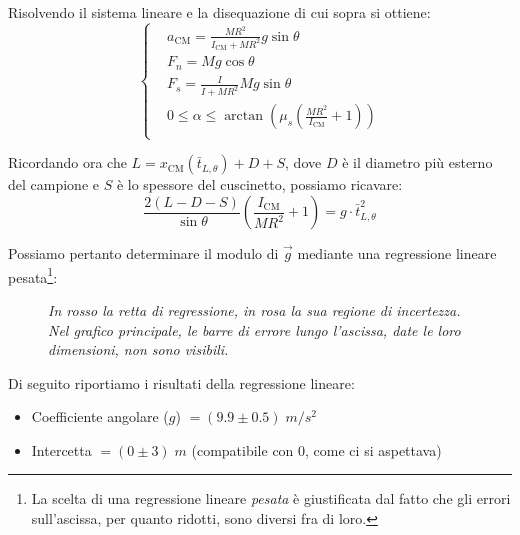 \documentclass{article}
\begin{document}
Risolvendo il sistema lineare e la disequazione di cui sopra si ottiene:
\[\left\{\begin{aligned}
    &a_\text{CM} = \frac{M R^2}{I_\text{CM} + M R^2} g\sin\theta \\
    &F_n = M g \cos\theta \\
    &F_s = \frac{I}{I + M R^2} M g \sin\theta \\
    & 0 \le \alpha \le \arctan\left(\mu_s \left(\frac{MR^2}{I_\text{CM}} + 1\right)\right) \\
\end{aligned}\right.\]

Ricordando ora che $L = x_\text{CM}(\bar{t}_{L,\theta}) + D + S$, dove $D$ è il diametro
più esterno del campione e $S$ è lo spessore del cuscinetto, possiamo ricavare:
\[
    \frac{2(L-D-S)}{\sin\theta}\left(\frac{I_\text{CM}}{M R^2} + 1\right) = g \cdot \bar{t}_{L,\theta}^2
\]

Possiamo pertanto determinare il modulo di $\vec{g}$ mediante una regressione
lineare pesata\footnote{
    La scelta di una regressione lineare \emph{pesata} è giustificata dal fatto
    che gli errori sull'ascissa, per quanto ridotti, sono diversi fra di loro.
}:
\begin{figure}[H]
    \caption*{\emph{
        In rosso la retta di regressione, in rosa la sua regione di incertezza. \\
        Nel grafico principale, le barre di errore lungo l'ascissa, date le loro
        dimensioni, non sono visibili.
    }}
\end{figure}

Di seguito riportiamo i risultati della regressione lineare:
\begin{itemize}
    \item Coefficiente angolare ($g$) $=(9.9\pm0.5)\;\unit{m \per s^2}$
    \item Intercetta $=(0\pm3)\;\unit{m}$ (compatibile con $0$, come ci si aspettava)
\end{itemize}
\end{document}
